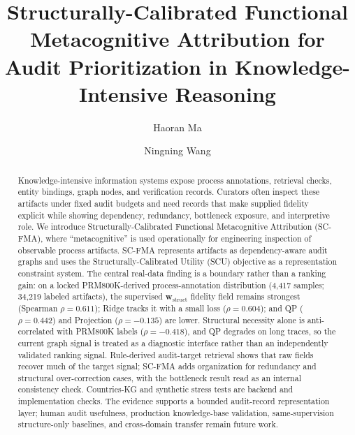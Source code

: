 \documentclass[a4paper,fleqn]{cas-sc}
\newcommand{\wstruct}{\ensuremath{\mathbf{w}_{\mathrm{struct}}}}
\begin{document}
\let\WriteBookmarks\relax
\def\floatpagepagefraction{1}
\def\textpagefraction{.001}


\title[mode=title]{Structurally-Calibrated Functional Metacognitive Attribution for Audit Prioritization in Knowledge-Intensive Reasoning}

\author[1]{Haoran Ma}

\author[1,2]{Ningning Wang}

\renewcommand{\printorcid}{}



\begin{abstract}
Knowledge-intensive information systems expose process annotations, retrieval checks, entity bindings, graph nodes, and verification records. Curators often inspect these artifacts under fixed audit budgets and need records that make supplied fidelity explicit while showing dependency, redundancy, bottleneck exposure, and interpretive role. We introduce Structurally-Calibrated Functional Metacognitive Attribution (SC-FMA), where ``metacognitive'' is used operationally for engineering inspection of observable process artifacts. SC-FMA represents artifacts as dependency-aware audit graphs and uses the Structurally-Calibrated Utility (SCU) objective as a representation constraint system. The central real-data finding is a boundary rather than a ranking gain: on a locked PRM800K-derived process-annotation distribution (4,417 samples; 34,219 labeled artifacts), the supervised \wstruct{} fidelity field remains strongest (Spearman $\rho=0.611$); Ridge tracks it with a small loss ($\rho=0.604$); and QP ($\rho=0.442$) and Projection ($\rho=-0.135$) are lower. Structural necessity alone is anti-correlated with PRM800K labels ($\rho=-0.418$), and QP degrades on long traces, so the current graph signal is treated as a diagnostic interface rather than an independently validated ranking signal. Rule-derived audit-target retrieval shows that raw fields recover much of the target signal; SC-FMA adds organization for redundancy and structural over-correction cases, with the bottleneck result read as an internal consistency check. Countries-KG and synthetic stress tests are backend and implementation checks. The evidence supports a bounded audit-record representation layer; human audit usefulness, production knowledge-base validation, same-supervision structure-only baselines, and cross-domain transfer remain future work.
\end{abstract}
\end{document}
